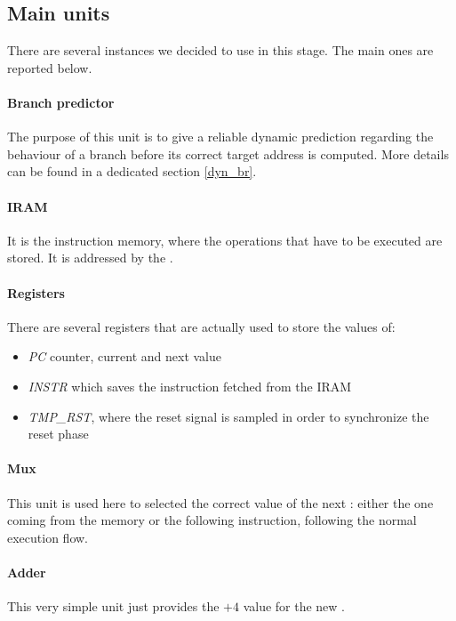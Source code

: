 \subsection{Main units}
There are several instances we decided to use in this stage. The main ones are reported below.
\paragraph{Branch predictor}
The purpose of this unit is to give a reliable dynamic prediction regarding the behaviour of a branch before its correct target address is computed. More details can be found in a dedicated section \ref{dyn_br}.
\paragraph{IRAM}
It is the instruction memory, where the operations that have to be executed are stored. It is addressed by the \pc.
\paragraph{Registers}
There are several registers that are actually used to store the values of:
\begin{itemize}
	\item \textit{PC} counter, current and next value
	\item \textit{INSTR} which saves the instruction fetched from the \textsf{IRAM}
	\item \textit{TMP\_RST}, where the reset signal is sampled in order to synchronize the reset phase
\end{itemize}
\paragraph{Mux}
This unit is used here to selected the correct value of the next \pc: either the one coming from the memory or the following instruction, following the normal execution flow.
\paragraph{Adder}
This very simple unit just provides the $+4$ value for the new \pc.